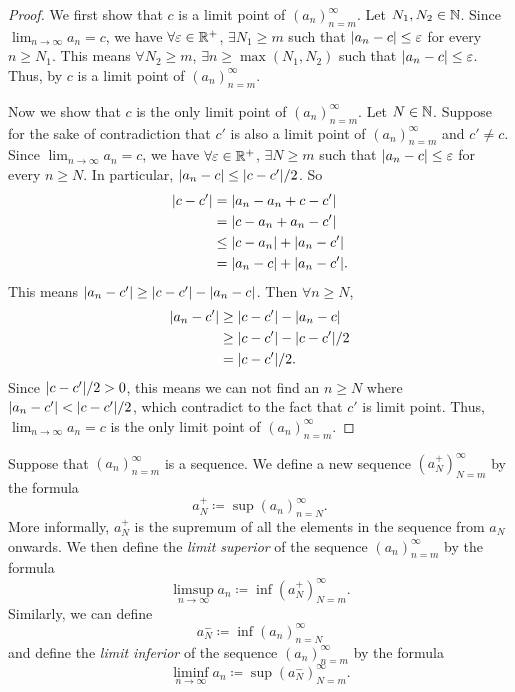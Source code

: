 \begin{proof}
  We first show that \(c\) is a limit point of \((a_n)_{n = m}^\infty\).
  Let \(N_1, N_2 \in \mathbb{N}\).
  Since \(\lim_{n \to \infty} a_n = c\), we have \(\forall \varepsilon \in \mathbb{R}^+\), \(\exists N_1 \geq m\) such that \(\left\lvert a_n - c\right\rvert \leq \varepsilon\) for every \(n \geq N_1\).
  This means \(\forall N_2 \geq m\), \(\exists n \geq \max(N_1, N_2)\) such that \(\left\lvert a_n - c\right\rvert \leq \varepsilon\).
  Thus, by  \(c\) is a limit point of \((a_n)_{n = m}^\infty\).

  Now we show that \(c\) is the only limit point of \((a_n)_{n = m}^\infty\).
  Let \(N \in \mathbb{N}\).
  Suppose for the sake of contradiction that \(c'\) is also a limit point of \((a_n)_{n = m}^\infty\) and \(c' \neq c\).
  Since \(\lim_{n \to \infty} a_n = c\), we have \(\forall \varepsilon \in \mathbb{R}^+\), \(\exists N \geq m\) such that \(\left\lvert a_n - c\right\rvert \leq \varepsilon\) for every \(n \geq N\).
  In particular, \(\abs{a_n - c} \leq \abs{c - c'} / 2\).
  So
  \begin{align*}
    \abs{c - c'} & = \abs{a_n - a_n + c - c'}          \\
                 & = \abs{c - a_n + a_n - c'}          \\
                 & \leq \abs{c - a_n} + \abs{a_n - c'} \\
                 & = \abs{a_n - c} + \abs{a_n - c'}.
  \end{align*}
  This means \(\left\lvert a_n - c'\right\rvert \geq \left\lvert c - c'\right\rvert - \left\lvert a_n - c\right\rvert\).
  Then \(\forall n \geq N\),
  \begin{align*}
    \abs{a_n - c'} & \geq \abs{c - c'} - \abs{a_n - c}    \\
                   & \geq \abs{c - c'} - \abs{c - c'} / 2 \\
                   & = \abs{c - c'} / 2.
  \end{align*}
  Since \(\abs{c - c'} / 2 > 0\), this means we can not find an \(n \geq N\) where \(\abs{a_n - c'} < \abs{c - c'} / 2\), which contradict to the fact that \(c'\) is limit point.
  Thus, \(\lim_{n \to \infty} a_n = c\) is the only limit point of \((a_n)_{n = m}^\infty\).
\end{proof}

\begin{defn}\label{i:6.4.6}
  Suppose that \((a_n)_{n = m}^\infty\) is a sequence.
  We define a new sequence \((a_N^+)_{N = m}^\infty\) by the formula
  \[
    a_N^+ \coloneqq \sup(a_n)_{n = N}^\infty.
  \]
  More informally, \(a_N^+\) is the supremum of all the elements in the sequence from \(a_N\) onwards.
  We then define the \emph{limit superior} of the sequence \((a_n)_{n = m}^\infty\) by the formula
  \[
    \limsup_{n \to \infty} a_n \coloneqq \inf(a_N^+)_{N = m}^\infty.
  \]
  Similarly, we can define
  \[
    a_N^- \coloneqq \inf(a_n)_{n = N}^\infty
  \]
  and define the \emph{limit inferior} of the sequence \((a_n)_{n = m}^\infty\) by the formula
  \[
    \liminf_{n \to \infty} a_n \coloneqq \sup(a_N^-)_{N = m}^\infty.
  \]
\end{defn}

